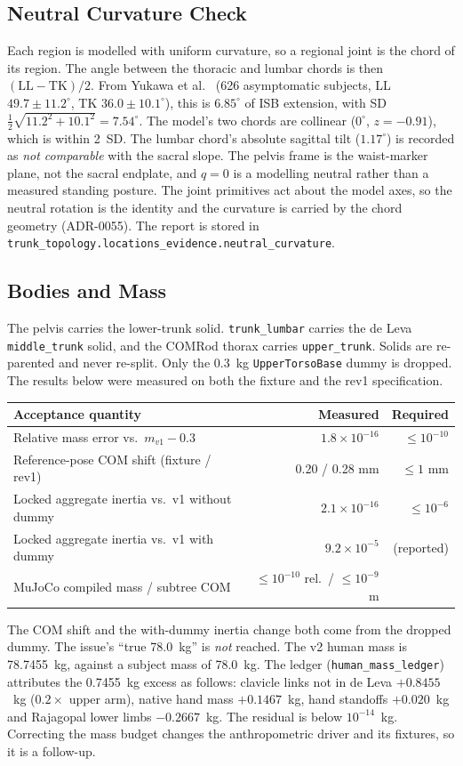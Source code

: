 \documentclass[11pt,a4paper]{article}
\begin{document}
\subsection{Neutral Curvature Check}
Each region is modelled with uniform curvature, so a regional joint is the
chord of its region. The angle between the thoracic and lumbar chords is then
$(\mathrm{LL}-\mathrm{TK})/2$. From Yukawa et al.\ \cite{Yukawa2018}
(626 asymptomatic subjects, LL $49.7\pm11.2^\circ$, TK $36.0\pm10.1^\circ$),
this is $6.85^\circ$ of ISB extension, with SD
$\tfrac12\sqrt{11.2^2+10.1^2}=7.54^\circ$. The model's two chords are
collinear ($0^\circ$, $z=-0.91$), which is within 2~SD. The lumbar chord's
absolute sagittal tilt ($1.17^\circ$) is recorded as \emph{not comparable}
with the sacral slope. The pelvis frame is the waist-marker plane, not the
sacral endplate, and $q=0$ is a modelling neutral rather than a measured
standing posture. The joint primitives act about the model axes, so the
neutral rotation is the identity and the curvature is carried by the chord
geometry (ADR-0055). The report is stored in
\texttt{trunk\_topology.locations\_evidence.neutral\_curvature}.

\subsection{Bodies and Mass}
The pelvis carries the lower-trunk solid. \texttt{trunk\_lumbar} carries the
de Leva \texttt{middle\_trunk} solid, and the COMRod thorax carries
\texttt{upper\_trunk}. Solids are re-parented and never re-split. Only the
0.3~kg \texttt{UpperTorsoBase} dummy is dropped. The results below were
measured on both the fixture and the rev1 specification.
\begin{center}
\begin{tabular}{lrr}
Acceptance quantity & Measured & Required \\
\hline
Relative mass error vs.\ $m_{v1}-0.3$ & $1.8\times10^{-16}$ & $\le10^{-10}$ \\
Reference-pose COM shift (fixture / rev1) & 0.20 / 0.28 mm & $\le1$ mm \\
Locked aggregate inertia vs.\ v1 without dummy & $2.1\times10^{-16}$ & $\le10^{-6}$ \\
Locked aggregate inertia vs.\ v1 with dummy & $9.2\times10^{-5}$ & (reported) \\
MuJoCo compiled mass / subtree COM & $\le10^{-10}$ rel.\ / $\le10^{-9}$ m & \\
\end{tabular}
\end{center}
The COM shift and the with-dummy inertia change both come from the dropped
dummy. The issue's ``true 78.0~kg'' is \emph{not} reached. The v2 human
mass is 78.7455~kg, against a subject mass of 78.0~kg. The ledger
(\texttt{human\_mass\_ledger}) attributes the 0.7455~kg excess as follows:
clavicle links not in de Leva $+0.8455$~kg ($0.2\times$ upper arm), native
hand mass $+0.1467$~kg, hand standoffs $+0.020$~kg and Rajagopal lower limbs
$-0.2667$~kg. The residual is below $10^{-14}$~kg. Correcting the mass budget
changes the anthropometric driver and its fixtures, so it is a follow-up.
\end{document}
